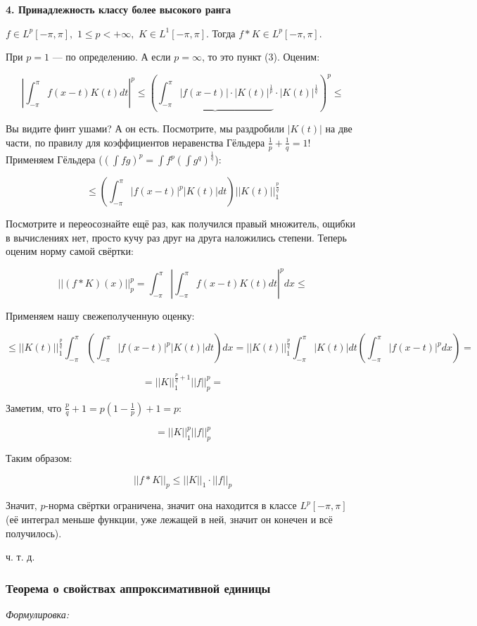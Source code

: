 \documentclass{article}
\def\dbl{\,\,}
\begin{document}
\textbf{4. Принадлежность классу более высокого ранга}

$f \in L^p[-\pi, \pi], \dbl 1 \le p < +\infty, \dbl K \in L^1[-\pi, \pi]$. Тогда $f * K \in L^p[-\pi, \pi]$.

При $p = 1$ --- по определению. А если $p = \infty$, то это пункт (3). Оценим:

\[\left|\int_{-\pi}^{\pi}f(x - t)K(t)dt\right|^p \le \left( \underbrace{\int_{-\pi}^{\pi} |f(x - t)| \cdot |K(t)|^{\frac{1}{p}}} \cdot |K(t)|^{\frac{1}{q}}\right)^p \le \]

Вы видите финт ушами? А он есть. Посмотрите, мы раздробили $|K(t)|$ на две части, по правилу для коэффициентов неравенства Гёльдера $\frac{1}{p} + \frac{1}{q} = 1$! Применяем Гёльдера ($(\int fg)^p = \int f^p (\int g^q)^{\frac{1}{q}}$):

\[\le \left( \int_{-\pi}^{\pi} |f(x - t)|^p|K(t)| dt\right)||K(t)||_1^{\frac{p}{q}}\]

Посмотрите и переосознайте ещё раз, как получился правый множитель, ощибки в вычислениях нет, просто кучу раз друг на друга наложились степени. Теперь оценим норму самой свёртки:

\[||(f * K)(x)||_p^p = \int_{-\pi}^{\pi} \left|\int_{-\pi}^{\pi}f(x - t)K(t)dt \right|^pdx \le\]

Применяем нашу свежеполученную оценку:

\[\le ||K(t)||_1^{\frac{p}{q}}\int_{-\pi}^{\pi} \left( \int_{-\pi}^{\pi} |f(x - t)|^p|K(t)| dt\right) dx = ||K(t)||_1^{\frac{p}{q}}\int_{-\pi}^{\pi}|K(t)| dt \left( \int_{-\pi}^{\pi} |f(x - t)|^p dx\right) =\]

\[= ||K||_1^{\frac{p}{q} + 1}||f||_p^p =\]

Заметим, что $\frac{p}{q} + 1 = p\left(1 - \frac{1}{p}\right) + 1= p$:

\[=||K||_1^p||f||_p^p\]

Таким образом:

\[||f * K||_p \le ||K||_1 \cdot ||f||_p \]

Значит, $p$-норма свёртки ограничена, значит она находится в классе $L^p[-\pi, \pi]$ (её интеграл меньше функции, уже лежащей в ней, значит он конечен и всё получилось).

ч. т. д. 

\subsubsection{Теорема о свойствах аппроксимативной единицы}
\textit{Формулировка:}
\end{document}

